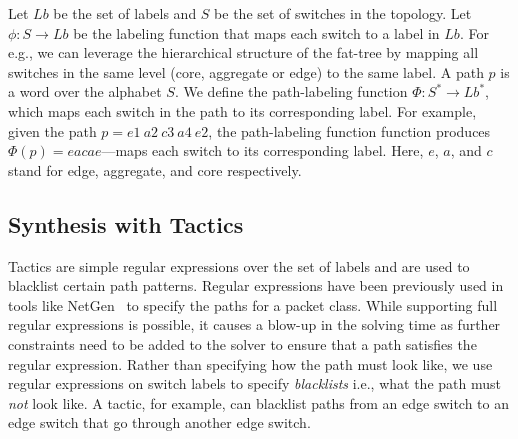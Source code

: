  Let $Lb$ be the set of labels and $S$ be the set of switches in the topology. 
 Let $\phi : S \rightarrow Lb$ be the labeling function that maps each switch to a label in $Lb$. 
For e.g., we can leverage the hierarchical structure of the fat-tree by
mapping all switches in the same level (core, aggregate or edge) to the same label.
A path $p$ is a word over the alphabet $S$. 
We define the path-labeling function $\Phi : S^* \rightarrow Lb^*$,  which maps each switch in the path to its corresponding 
 label. 
 For example, given the path $p = e1\ a2\ c3\ a4\ e2$, the path-labeling function function produces 
 $\Phi(p) = eacae$---maps each switch to its corresponding label.
 Here, $e$, $a$, and $c$ stand for edge, aggregate, and core respectively.

\subsection{Synthesis with Tactics}
Tactics are simple regular expressions over the set
 of labels and are used to blacklist certain path patterns.
Regular expressions have been previously used in tools like
NetGen~\cite{netgen} to specify the paths for a packet class.
While supporting full regular expressions is possible, it causes a blow-up in the solving time as further
constraints need to be added to the solver to ensure that a path satisfies the regular expression. 
Rather than specifying how the path must look like,
 we use regular expressions on switch labels to specify \emph{blacklists} i.e.,
what the path must \emph{not} look like. A tactic,
 for example, can blacklist paths from an edge switch to an edge switch that go through another edge switch. 

